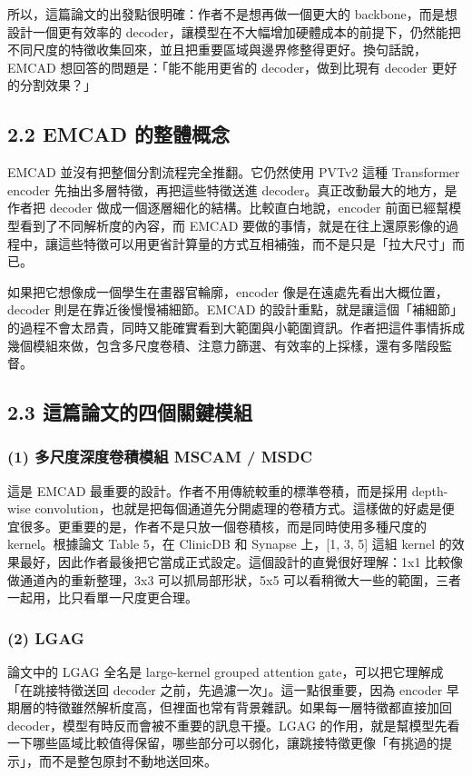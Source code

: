 \documentclass[a4paper,12pt,twocolumn]{article}
\begin{document}
所以，這篇論文的出發點很明確：作者不是想再做一個更大的 backbone，而是想設計一個更有效率的 decoder，讓模型在不大幅增加硬體成本的前提下，仍然能把不同尺度的特徵收集回來，並且把重要區域與邊界修整得更好。換句話說，EMCAD 想回答的問題是：「能不能用更省的 decoder，做到比現有 decoder 更好的分割效果？」

\subsection*{2.2 EMCAD 的整體概念}
EMCAD 並沒有把整個分割流程完全推翻。它仍然使用 PVTv2 這種 Transformer encoder 先抽出多層特徵，再把這些特徵送進 decoder。真正改動最大的地方，是作者把 decoder 做成一個逐層細化的結構。比較直白地說，encoder 前面已經幫模型看到了不同解析度的內容，而 EMCAD 要做的事情，就是在往上還原影像的過程中，讓這些特徵可以用更省計算量的方式互相補強，而不是只是「拉大尺寸」而已。

如果把它想像成一個學生在畫器官輪廓，encoder 像是在遠處先看出大概位置，decoder 則是在靠近後慢慢補細節。EMCAD 的設計重點，就是讓這個「補細節」的過程不會太昂貴，同時又能確實看到大範圍與小範圍資訊。作者把這件事情拆成幾個模組來做，包含多尺度卷積、注意力篩選、有效率的上採樣，還有多階段監督。

\subsection*{2.3 這篇論文的四個關鍵模組}
\subsubsection*{(1) 多尺度深度卷積模組 MSCAM / MSDC}
這是 EMCAD 最重要的設計。作者不用傳統較重的標準卷積，而是採用 depth-wise convolution，也就是把每個通道先分開處理的卷積方式。這樣做的好處是便宜很多。更重要的是，作者不是只放一個卷積核，而是同時使用多種尺度的 kernel。根據論文 Table 5，在 ClinicDB 和 Synapse 上，[1, 3, 5] 這組 kernel 的效果最好，因此作者最後把它當成正式設定。這個設計的直覺很好理解：1x1 比較像做通道內的重新整理，3x3 可以抓局部形狀，5x5 可以看稍微大一些的範圍，三者一起用，比只看單一尺度更合理。

\subsubsection*{(2) LGAG}
論文中的 LGAG 全名是 large-kernel grouped attention gate，可以把它理解成「在跳接特徵送回 decoder 之前，先過濾一次」。這一點很重要，因為 encoder 早期層的特徵雖然解析度高，但裡面也常有背景雜訊。如果每一層特徵都直接加回 decoder，模型有時反而會被不重要的訊息干擾。LGAG 的作用，就是幫模型先看一下哪些區域比較值得保留，哪些部分可以弱化，讓跳接特徵更像「有挑過的提示」，而不是整包原封不動地送回來。
\end{document}
